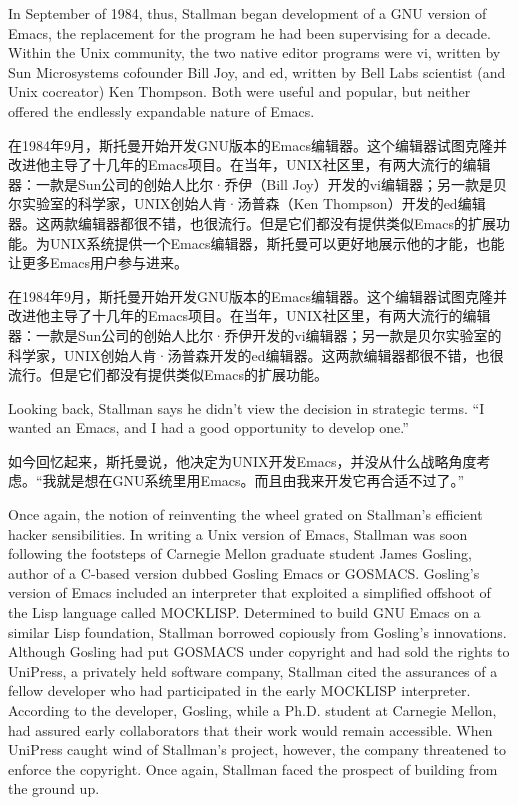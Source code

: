 \ifdefined\vtwo
In September of 1984, thus, Stallman began development of a GNU version of Emacs, the replacement for the program he had been supervising for a decade. Within the Unix community, the two native editor programs were vi, written by Sun Microsystems cofounder Bill Joy, and ed, written by Bell Labs scientist (and Unix cocreator) Ken Thompson. Both were useful and popular, but neither offered the endlessly expandable nature of Emacs.
\fi
\fi

\ifdefined\chs
\ifdefined\vone
在1984年9月，斯托曼开始开发GNU版本的Emacs编辑器。这个编辑器试图克隆并改进他主导了十几年的Emacs项目。在当年，UNIX社区里，有两大流行的编辑器：一款是Sun公司的创始人比尔·乔伊（Bill Joy）开发的vi编辑器；另一款是贝尔实验室的科学家，UNIX创始人肯·汤普森（Ken Thompson）开发的ed编辑器。这两款编辑器都很不错，也很流行。但是它们都没有提供类似Emacs的扩展功能。为UNIX系统提供一个Emacs编辑器，斯托曼可以更好地展示他的才能，也能让更多Emacs用户参与进来。
\fi

\ifdefined\vtwo
在1984年9月，斯托曼开始开发GNU版本的Emacs编辑器。这个编辑器试图克隆并改进他主导了十几年的Emacs项目。在当年，UNIX社区里，有两大流行的编辑器：一款是Sun公司的创始人比尔·乔伊开发的vi编辑器；另一款是贝尔实验室的科学家，UNIX创始人肯·汤普森开发的ed编辑器。这两款编辑器都很不错，也很流行。但是它们都没有提供类似Emacs的扩展功能。
\fi
\fi

\ifdefined\eng
Looking back, Stallman says he didn't view the decision in strategic terms. ``I wanted an Emacs, and I had a good opportunity to develop one.''
\fi

\ifdefined\chs
如今回忆起来，斯托曼说，他决定为UNIX开发Emacs，并没从什么战略角度考虑。``我就是想在GNU系统里用Emacs。而且由我来开发它再合适不过了。''
\fi

\ifdefined\vone
\ifdefined\eng
Once again, the notion of reinventing the wheel grated on Stallman's efficient hacker sensibilities. In writing a Unix version of Emacs, Stallman was soon following the footsteps of Carnegie Mellon graduate student James Gosling, author of a C-based version dubbed Gosling Emacs or GOSMACS. Gosling's version of Emacs included an interpreter that exploited a simplified offshoot of the Lisp language called MOCKLISP. Determined to build GNU Emacs on a similar Lisp foundation, Stallman borrowed copiously from Gosling's innovations. Although Gosling had put GOSMACS under copyright and had sold the rights to UniPress, a privately held software company, Stallman cited the assurances of a fellow developer who had participated in the early MOCKLISP interpreter. According to the developer, Gosling, while a Ph.D. student at Carnegie Mellon, had assured early collaborators that their work would remain accessible. When UniPress caught wind of Stallman's project, however, the company threatened to enforce the copyright. Once again, Stallman faced the prospect of building from the ground up.
\fi

